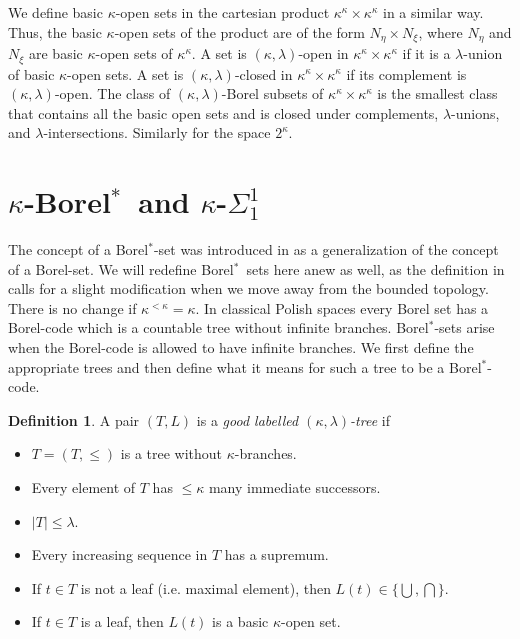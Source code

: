 \documentclass[12pt,a4paper]{amsart}
\theoremstyle{definition}
\newtheorem{defn}[thm]{Definition}
\theoremstyle{remark}
\def\borelstar{Borel\nobreak\hspace{1pt}$^*$}
\begin{document}
We define basic $\kappa$-open sets in the cartesian product $\kappa^\kappa\times\kappa^\kappa$ in a similar way. Thus, the basic $\kappa$-open sets of the product are of the form $N_\eta\times N_\xi$, where $N_\eta$ and $N_\xi$ are basic $\kappa$-open sets of $\kappa^\kappa$. A set is $(\kappa,\lambda)$-open in $\kappa^\kappa\times\kappa^\kappa$ if it is a $\lambda$-union of basic $\kappa$-open sets. A set is $(\kappa,\lambda)$-closed in $\kappa^\kappa\times\kappa^\kappa$ if its complement is $(\kappa,\lambda)$-open. The class of $(\kappa,\lambda)$-Borel subsets of $\kappa^\kappa\times\kappa^\kappa$ is the smallest class that contains all the basic open sets and is closed under complements, $\lambda$-unions, and $\lambda$-intersections. Similarly for the space $2^\kappa$.


\section{$\kappa$-\borelstar\ and $\kappa$-$\Sigma^1_1$}

The concept of a \borelstar-set was introduced in \cite{MR1242054} as a generalization of the concept of a Borel-set. We will redefine \borelstar\ sets here anew as well, as the definition in \cite{MR1242054} calls for a slight modification when we move away from the  bounded topology. There is no change if $\kappa^{<\kappa}=\kappa$. In classical Polish spaces every Borel set has a Borel-code which is a countable tree without infinite branches. \borelstar-sets  arise when the Borel-code is allowed to have infinite branches. We first define the appropriate trees and then define what it means for such a tree to be a \borelstar-code.

\begin{defn}\label{labelled_tree_star}
A pair $(T,L)$ is a \emph{good labelled $(\kappa,\lambda)$-tree} if 
\begin{itemize}
\item [(i)] $T=(T,\le)$ is a tree without $\kappa$-branches.
\item [(ii)] Every element of $T$ has $\le\kappa$ many immediate successors.
\item [(iii)] $|T|\le\lambda$.
\item [(iv)] Every increasing sequence in $T$ has a supremum.
\item [(v)] If $t\in T$ is not a leaf (i.e. maximal element), then $L(t)\in \{\bigcup,\bigcap\}$.
\item [(vi)]  If $t\in T$ is  a leaf, then $L(t)$ is a basic $\kappa$-open set.
\end{itemize}
\end{defn}
\end{document}

